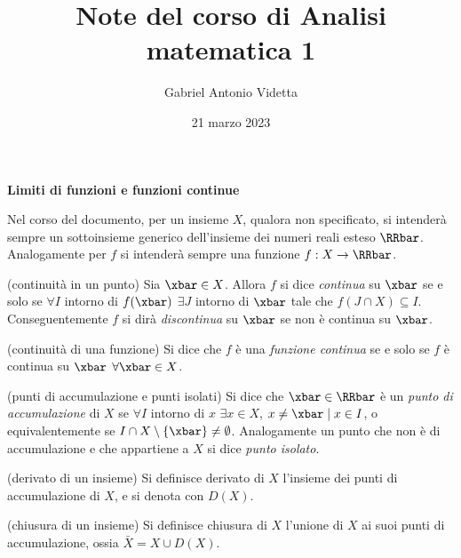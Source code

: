 \documentclass[11pt]{article}
\title{\textbf{Note del corso di Analisi matematica 1}}
\author{Gabriel Antonio Videtta}
\date{21 marzo 2023}
\begin{document}
	
	\maketitle
	
	\begin{center}
		\Large \textbf{Limiti di funzioni e funzioni continue}
	\end{center}
	
	\begin{note} Nel corso del documento, per un insieme $X$, qualora non
		specificato, si intenderà sempre un sottoinsieme generico dell'insieme
		dei numeri reali esteso $\RRbar$. Analogamente per $f$ si intenderà
		sempre una funzione $f : X \to \RRbar$.
	\end{note}
	
	\begin{definition} (continuità in un punto) Sia
		$\xbar \in X$. Allora $f$ si dice \textit{continua} su $\xbar$ se e solo
		se $\forall I$ intorno di $f(\xbar)$ $\exists J$ intorno di $\xbar$ tale
		che $f(J \cap X) \subseteq I$. Conseguentemente $f$ si dirà \textit{discontinua}
		su $\xbar$ se non è continua su $\xbar$.
	\end{definition}
	
	\begin{definition} (continuità di una funzione) Si dice che $f$ è una \textit{funzione 
			continua} se e solo se $f$ è continua su $\xbar$ $\forall \xbar \in X$.
	\end{definition}
	
	\begin{definition} (punti di accumulazione e punti isolati) Si dice che $\xbar \in \RRbar$ è un \textit{punto
			di accumulazione} di $X$ se $\forall I$ intorno di $x$ $\exists x \in X$, $x \neq \xbar \mid
		x \in I$, o equivalentemente se $I \cap X \setminus \{\xbar\} \neq \emptyset$. Analogamente
		un punto che non è di accumulazione e che appartiene a $X$ si dice \textit{punto isolato}.
	\end{definition}
	
	\begin{definition}
		(derivato di un insieme) Si definisce derivato di $X$ l'insieme dei punti di
		accumulazione di $X$, e si denota con $D(X)$.
	\end{definition}
	
	\begin{definition}
		(chiusura di un insieme) Si definisce chiusura di $X$ l'unione di $X$ ai suoi
		punti di accumulazione, ossia $\bar{X} = X \cup D(X)$.
	\end{definition}
	
\end{document}

